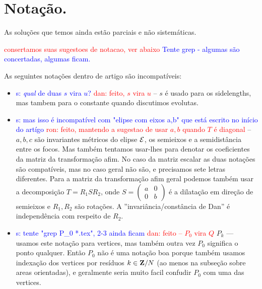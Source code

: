 \section{Notação.}

As soluções que temos ainda estão parciais e não sistemáticas.

\textcolor{red}{consertamos suas sugestoes de notacao, ver abaixo}
\textcolor{blue}{Tente grep - algumas são concertadas, algumas ficam.}

As seguintes notações dentro de artigo são incompatíveis:

\begin{itemize}
\item
\textcolor{blue}{s: \emph{qual} de duas $s$ vira $u$?}
\textcolor{red}{dan: feito, $s$ vira $u$}
-- $s$ é usado para os sidelengths, mas tambem para o constante quando discutimos evolutas.

\item
\textcolor{blue}{s: mas isso é incompatível com "elipse com eixos a,b" que está
escrito no início do artígo}
\textcolor{red}{ron: feito, mantendo a sugestao de usar $a,b$ quando $T$ é diagonal}
-- $a,b,c$ são invariantes métricos do elipse $\mathcal{E}$, os semieixos e a semidistância entre os focos.
      Mas também tentamos usar-lhes para denotar os coeficientes da matriz da transformação afim.
      No caso da matriz escalar as duas notações são compatíveis, mas no caso geral não são, e precisamos sete letras diferentes.
      Para a matriz da transformação afim geral podemos também usar a decomposição $T = R_1 S R_2$,
      onde $S=\begin{pmatrix}a&0\\0&b\end{pmatrix}$ é a dilatação em direção de semieixos e $R_1,R_2$ são rotações.
      A ''invariância/constância de Dan'' é independência com respeito de $R_2$. 

\item
\textcolor{blue}{s: tente "grep P\_0 *.tex", 2-3 ainda ficam}
\textcolor{red}{dan: feito -- $P_0$ vira $Q$}
$P_k$ --- usamos este notação para vertices, mas também outra vez $P_0$ significa o ponto qualquer.
      Então $P_0$ não é uma notação boa porque também usamos indexação dos vertices por resíduos $k \in \mathbf{Z}/N$ (ao menos na subseção sobre areas orientadas),
      e geralmente seria muito facil confudir $P_0$ com uma das vertices. 
\end{itemize}

